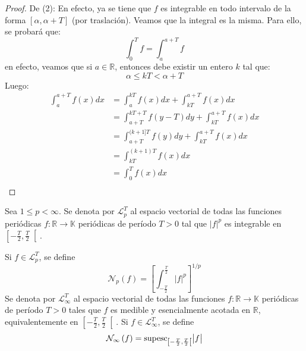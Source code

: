 \documentclass[12pt]{report}
\theoremstyle{largebreak}
\newcommand\cf[3]{\ensuremath{#1:#2\rightarrow#3}}
\newcommand\abs[1]{\ensuremath{\big|#1\big|}}
\newcommand{\N}[2]{\ensuremath{\mathcal{N}_{#1}\left(#2\right)}}
\begin{document}
    \begin{proof}
        De (2): En efecto, ya se tiene que $f$ es integrable en todo intervalo de la forma $\left[\alpha,\alpha+T \right]$ (por traslación). Veamos que la integral es la misma. Para ello, se probará que:
        \begin{equation*}
            \int_0^Tf=\int_a^{a+T}f
        \end{equation*}
        en efecto, veamos que si $a\in\mathbb{R}$, entonces debe existir un entero $k$ tal que:
        \begin{equation*}
            \alpha\leq kT<\alpha+T
        \end{equation*}
        Luego:
        \begin{equation*}
            \begin{split}
                \int_a^{a+T}f(x)dx&=\int_a^{kT}f(x)dx+\int_{kT}^{a+T}f(x)dx\\
                &=\int_{a+T}^{kT+T}f(y-T)dy+\int_{kT}^{a+T}f(x)dx\\
                &=\int_{a+T}^{(k+1]T}f(y)dy+\int_{kT}^{a+T}f(x)dx\\
                &=\int_{kT}^{(k+1)T}f(x)dx\\
                &=\int_{0}^{T}f(x)dx\\
            \end{split}
        \end{equation*}
    \end{proof}

    \begin{mydef}
        Sea $1\leq p<\infty$. Se denota por $\mathcal{L}_p^T$ al espacio vectorial de todas las funciones periódicas $\cf{f}{\mathbb{R}}{\mathbb{K}}$ periódicas de período $T>0$ tal que $\abs{f}^p$ es integrable en $\left[-\frac{T}{2},\frac{T}{2} \right[$.

        Si $f\in\mathcal{L}_p^T$, se define
        \begin{equation*}
            \N{p}{f}=\left[\int_{-\frac{T}{2}}^{\frac{T}{2}}\abs{f}^p \right]^{ 1/p}
        \end{equation*}
        Se denota por $\mathcal{L}_\infty^T$ al espacio vectorial de todas las funciones $\cf{f}{\mathbb{R}}{\mathbb{K}}$ periódicas de período $T>0$ tales que $f$ es medible y esencialmente acotada en $\mathbb{R}$, equivalentemente en $\left[-\frac{T}{2},\frac{T}{2} \right[$. Si $f\in\mathcal{L}_\infty^T$, se define
        \begin{equation*}
            \N{\infty}{f}=\textup{supesc}_{\left[-\frac{T}{2},\frac{T}{2} \right[}\abs{f}
        \end{equation*}
    \end{mydef}
    
\end{document}

